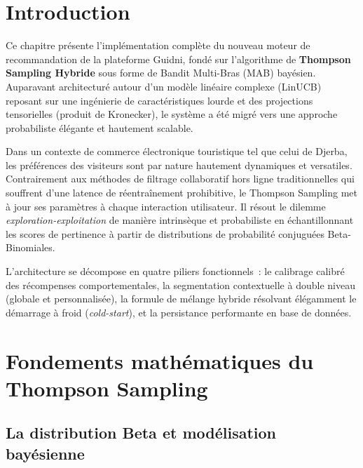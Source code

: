 
\section{Introduction}

Ce chapitre présente l'implémentation complète du nouveau moteur de recommandation de la plateforme Guidni, fondé sur l'algorithme de \textbf{Thompson Sampling Hybride} sous forme de Bandit Multi-Bras (MAB) bayésien. Auparavant architecturé autour d'un modèle linéaire complexe (LinUCB) reposant sur une ingénierie de caractéristiques lourde et des projections tensorielles (produit de Kronecker), le système a été migré vers une approche probabiliste élégante et hautement scalable. 

Dans un contexte de commerce électronique touristique tel que celui de Djerba, les préférences des visiteurs sont par nature hautement dynamiques et versatiles. Contrairement aux méthodes de filtrage collaboratif hors ligne traditionnelles qui souffrent d'une latence de réentraînement prohibitive, le Thompson Sampling met à jour ses paramètres à chaque interaction utilisateur. Il résout le dilemme \textit{exploration-exploitation} de manière intrinsèque et probabiliste en échantillonnant les scores de pertinence à partir de distributions de probabilité conjuguées Beta-Binomiales.

L'architecture se décompose en quatre piliers fonctionnels~: le calibrage calibré des récompenses comportementales, la segmentation contextuelle à double niveau (globale et personnalisée), la formule de mélange hybride résolvant élégamment le démarrage à froid (\textit{cold-start}), et la persistance performante en base de données.

\section{Fondements mathématiques du Thompson Sampling}

\subsection{La distribution Beta et modélisation bayésienne}

